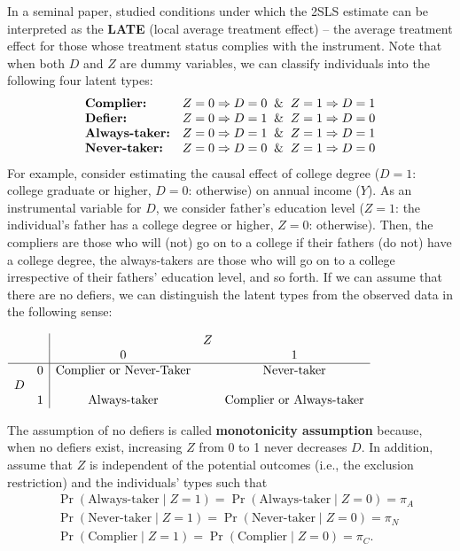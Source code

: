 \documentclass[10.5pt, A4paper, openany, uplatex]{book}
\numberwithin{equation}{section}
\begin{document}
In a seminal paper, \cite{imbens1994identification} studied conditions under which the 2SLS estimate can be interpreted as the \textbf{LATE} (local average treatment effect) -- the average treatment effect for those whose treatment status complies with the instrument. 
Note that when both $D$ and $Z$ are dummy variables, we can classify individuals into the following four latent types:
\[
\begin{array}{ll}
	\text{\bf Complier:} & Z = 0 \Rightarrow D = 0 \;\; \& \;\; Z = 1 \Rightarrow D = 1 \\
	\text{\bf Defier:}   & Z = 0 \Rightarrow D = 1 \;\; \& \;\; Z = 1 \Rightarrow D = 0 \\
	\text{\bf Always-taker:} & Z = 0 \Rightarrow D = 1 \;\; \& \;\; Z = 1 \Rightarrow D = 1 \\
	\text{\bf Never-taker:}  & Z = 0 \Rightarrow D = 0 \;\; \& \;\; Z = 1 \Rightarrow D = 0 
\end{array}
\]
For example, consider estimating the causal effect of college degree ($D = 1$: college graduate or higher, $D = 0$: otherwise) on annual income ($Y$).
As an instrumental variable for $D$, we consider father's education level ($Z = 1$: the individual's father has a college degree or higher, $Z = 0$: otherwise).
Then, the compliers are those who will (not) go on to a college if their fathers (do not) have a college degree, the always-takers are those who will go on to a college irrespective of their fathers' education level, and so forth.
If we can assume that there are no defiers, we can distinguish the latent types from the observed data in the following sense: 
\begin{center}
	$
	\begin{array}
	[c]{cc|ccc}
	&  &  & Z & \\
	&  & 0 &  & 1\\\hline
	& 0 & \text{Complier or Never-Taker} &  & \text{Never-taker}\\
	D &  &  &  & \\
	& 1 & \text{Always-taker} &  & \text{Complier or Always-taker}
	\end{array}
	$
\end{center}
The assumption of no defiers is called \textbf{monotonicity assumption} because, when no defiers exist, increasing $Z$ from 0 to 1 never decreases $D$.
In addition, assume that $Z$ is independent of the potential outcomes (i.e., the exclusion restriction) and the individuals' types such that
\begin{align*}
	& \Pr(\text{Always-taker} \mid Z = 1) = \Pr(\text{Always-taker} \mid Z = 0) = \pi_A\\
	& \Pr(\text{Never-taker} \mid Z = 1) = \Pr(\text{Never-taker} \mid Z = 0) = \pi_N\\
	& \Pr(\text{Complier} \mid Z = 1) = \Pr(\text{Complier} \mid Z = 0) = \pi_C.
\end{align*}
\end{document}
